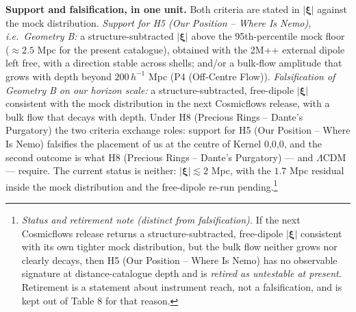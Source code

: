 \documentclass[
  11pt,
]{article}
\begin{document}
\textbf{Support and falsification, in one unit.} Both criteria are
stated in \(|\boldsymbol{\xi}|\) against the mock distribution.
\emph{Support for H5 (Our Position -- Where Is Nemo), i.e.~Geometry B:}
a structure-subtracted \(|\boldsymbol{\xi}|\) above the 95th-percentile
mock floor (\(\approx 2.5\) Mpc for the present catalogue), obtained
with the 2M++ external dipole left free, with a direction stable across
shells; and/or a bulk-flow amplitude that grows with depth beyond
\(200\,h^{-1}\) Mpc (P4 (Off-Centre Flow)). \emph{Falsification of
Geometry B on our horizon scale:} a structure-subtracted, free-dipole
\(|\boldsymbol{\xi}|\) consistent with the mock distribution in the next
Cosmicflows release, with a bulk flow that decays with depth. Under H8
(Precious Rings -- Dante's Purgatory) the two criteria exchange roles:
support for H5 (Our Position -- Where Is Nemo) falsifies the placement
of us at the centre of Kernel 0,0,0, and the second outcome is what H8
(Precious Rings -- Dante's Purgatory) --- and \(\Lambda\)CDM ---
require. The current status is neither:
\(|\boldsymbol{\xi}| \lesssim 2\) Mpc, with the \(1.7\) Mpc residual
inside the mock distribution and the free-dipole re-run
pending.\footnote{\emph{Status and retirement note (distinct from
  falsification).} If the next Cosmicflows release returns a
  structure-subtracted, free-dipole \(|\boldsymbol{\xi}|\) consistent
  with its own tighter mock distribution, but the bulk flow neither
  grows nor clearly decays, then H5 (Our Position -- Where Is Nemo) has
  no observable signature at distance-catalogue depth and is
  \emph{retired as untestable at present}. Retirement is a statement
  about instrument reach, not a falsification, and is kept out of Table
  8 for that reason.}
\end{document}
